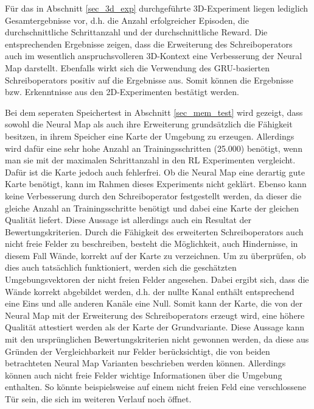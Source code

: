 Für das in Abschnitt \ref{sec_3d_exp} durchgeführte 3D-Experiment liegen lediglich Gesamtergebnisse vor, d.h. die Anzahl erfolgreicher Episoden, die durchschnittliche Schrittanzahl und der durchschnittliche Reward. Die entsprechenden Ergebnisse zeigen, dass die Erweiterung des Schreiboperators auch im wesentlich anspruchsvolleren 3D-Kontext eine Verbesserung der Neural Map darstellt. Ebenfalls wirkt sich die Verwendung des GRU-basierten Schreiboperators positiv auf die Ergebnisse aus. Somit können die Ergebnisse bzw. Erkenntnisse aus den 2D-Experimenten bestätigt werden.

Bei dem seperaten Speichertest in Abschnitt \ref{sec_mem_test} wird gezeigt, dass sowohl die Neural Map als auch ihre Erweiterung grundsätzlich die Fähigkeit besitzen, in ihrem Speicher eine Karte der Umgebung zu erzeugen. Allerdings wird dafür eine sehr hohe Anzahl an Trainingsschritten (25.000) benötigt, wenn man sie mit der maximalen Schrittanzahl in den RL Experimenten vergleicht. Dafür ist die Karte jedoch auch fehlerfrei. Ob die Neural Map eine derartig gute Karte benötigt, kann im Rahmen dieses Experiments nicht geklärt. Ebenso kann keine Verbesserung durch den Schreiboperator festgestellt werden, da dieser die gleiche Anzahl an Trainingsschritte benötigt und dabei eine Karte der gleichen Qualität liefert. Diese Aussage ist allerdings auch ein Resultat der Bewertungskriterien. Durch die Fähigkeit des erweiterten Schreiboperators auch nicht freie Felder zu beschreiben, besteht die Möglichkeit, auch Hindernisse, in diesem Fall Wände, korrekt auf der Karte zu verzeichnen. Um zu überprüfen, ob dies auch tatsächlich funktioniert, werden sich die geschätzten Umgebungsvektoren der nicht freien Felder angesehen. Dabei ergibt sich, dass die Wände korrekt abgebildet werden, d.h. der nullte Kanal enthält entsprechend eine Eins und alle anderen Kanäle eine Null. Somit kann der Karte, die von der Neural Map mit der Erweiterung des Schreiboperators erzeugt wird, eine höhere Qualität attestiert werden als der Karte der Grundvariante. Diese Aussage kann mit den ursprünglichen Bewertungskriterien nicht gewonnen werden, da diese aus Gründen der Vergleichbarkeit nur Felder berücksichtigt, die von beiden betrachteten Neural Map Varianten beschrieben werden können. Allerdings können auch nicht freie Felder wichtige Informationen über die Umgebung enthalten. So könnte beispielsweise auf einem nicht freien Feld eine verschlossene Tür sein, die sich im weiteren Verlauf noch öffnet.


